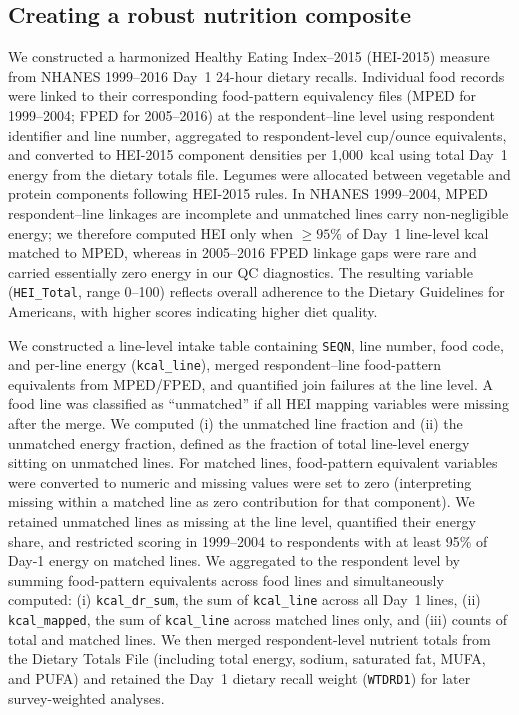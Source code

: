 \documentclass[12pt,leqno,titlepage]{amsart}
\newcommand{\1}{\mathbbm{1}}
\begin{document}
\begin{bibunit}
\subsection{Creating a robust nutrition composite} \label{appendix:diet}
We constructed a harmonized Healthy Eating Index--2015 (HEI-2015) measure from NHANES 1999--2016 Day~1 24-hour dietary recalls. Individual food records were linked to their corresponding food-pattern equivalency files (MPED for 1999--2004; FPED for 2005--2016) at the respondent--line level using respondent identifier and line number, aggregated to respondent-level cup/ounce equivalents, and converted to HEI-2015 component densities per 1{,}000~kcal using total Day~1 energy from the dietary totals file. Legumes were allocated between vegetable and protein components following HEI-2015 rules. In NHANES 1999--2004, MPED respondent--line linkages are incomplete and unmatched lines carry non-negligible energy; we therefore computed HEI only when $\ge 95\%$ of Day~1 line-level kcal matched to MPED, whereas in 2005--2016 FPED linkage gaps were rare and carried essentially zero energy in our QC diagnostics. The resulting variable (\texttt{HEI\_Total}, range 0--100) reflects overall adherence to the Dietary Guidelines for Americans, with higher scores indicating higher diet quality.

We constructed a line-level intake table containing \texttt{SEQN}, line number, food code, and per-line energy (\texttt{kcal\_line}), merged respondent--line food-pattern equivalents from MPED/FPED, and quantified join failures at the line level. A food line was classified as ``unmatched'' if all HEI mapping variables were missing after the merge. We computed (i) the unmatched line fraction and (ii) the unmatched energy fraction, defined as the fraction of total line-level energy sitting on unmatched lines. For matched lines, food-pattern equivalent variables were converted to numeric and missing values were set to zero (interpreting missing within a matched line as zero contribution for that component). We retained unmatched lines as missing at the line level, quantified their energy share, and restricted scoring in 1999–2004 to respondents with at least 95\% of Day-1 energy on matched lines. We aggregated to the respondent level by summing food-pattern equivalents across food lines and simultaneously computed:
(i) \texttt{kcal\_dr\_sum}, the sum of \texttt{kcal\_line} across all Day~1 lines,
(ii) \texttt{kcal\_mapped}, the sum of \texttt{kcal\_line} across matched lines only,
and (iii) counts of total and matched lines.
We then merged respondent-level nutrient totals from the Dietary Totals File (including total energy, sodium, saturated fat, MUFA, and PUFA) and retained the Day~1 dietary recall weight (\texttt{WTDRD1}) for later survey-weighted analyses.


\end{bibunit}
\end{document}
